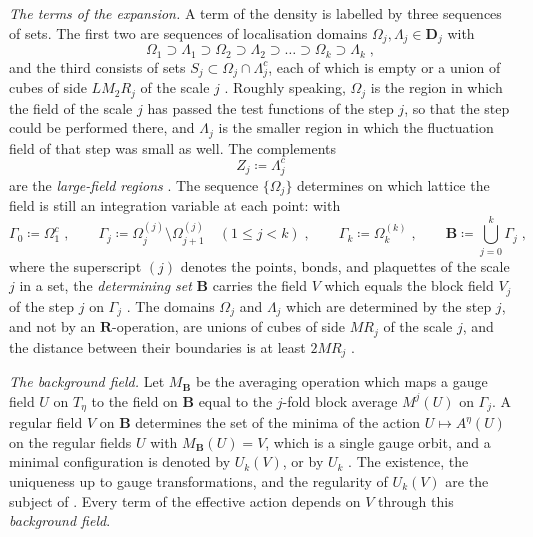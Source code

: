 \documentclass[11pt]{preprint}
\numberwithin{equation}{section}
\theoremstyle{definition}
\theoremstyle{remark}
\theoremstyle{plain}
\begin{document}
\emph{The terms of the expansion.} A term of the density is labelled by three sequences of sets. The first two are sequences of localisation domains $\Omega_j, \Lambda_j \in \mathbf D_j$ with
\begin{equation}\label{eq:domain-sequences}
    \Omega_1 \supset \Lambda_1 \supset \Omega_2 \supset \Lambda_2 \supset \dots \supset \Omega_k \supset \Lambda_k\;,
\end{equation}
and the third consists of sets $S_j \subset \Omega_j \cap \Lambda_j^c$, each of which is empty or a union of cubes of side $LM_2R_j$ of the scale $j$ \cite[(2.1), p.~254]{BalabanCRE}. Roughly speaking, $\Omega_j$ is the region in which the field of the scale $j$ has passed the test functions of the step $j$, so that the step could be performed there, and $\Lambda_j$ is the smaller region in which the fluctuation field of that step was small as well. The complements
\begin{equation}\label{eq:large-field-regions}
    Z_j \coloneqq \Lambda_j^c
\end{equation}
are the \emph{large-field regions} \cite[(2.3), p.~255]{BalabanCRE}. The sequence $\{ \Omega_j \}$ determines on which lattice the field is still an integration variable at each point: with
\begin{equation}\label{eq:determining-set}
    \Gamma_0 \coloneqq \Omega_1^c\;,
    \qquad
    \Gamma_j \coloneqq \Omega_j^{(j)} \setminus \Omega_{j+1}^{(j)} \quad (1 \leq j < k)\;,
    \qquad
    \Gamma_k \coloneqq \Omega_k^{(k)}\;,
    \qquad
    \mathbf B \coloneqq \bigcup_{j=0}^{k}\Gamma_j\;,
\end{equation}
where the superscript $(j)$ denotes the points, bonds, and plaquettes of the scale $j$ in a set, the \emph{determining set} $\mathbf B$ carries the field $V$ which equals the block field $V_j$ of the step $j$ on $\Gamma_j$ \cite[(2.2), (2.10), pp.~255--256]{BalabanCRE}. The domains $\Omega_j$ and $\Lambda_j$ which are determined by the step $j$, and not by an $\mathbf R$-operation, are unions of cubes of side $MR_j$ of the scale $j$, and the distance between their boundaries is at least $2MR_j$ \cite[p.~256]{BalabanCRE}.

\emph{The background field.} Let $M_{\mathbf B}$ be the averaging operation which maps a gauge field $U$ on $T_\eta$ to the field on $\mathbf B$ equal to the $j$-fold block average $M^j(U)$ on $\Gamma_j$. A regular field $V$ on $\mathbf B$ determines the set of the minima of the action $U \mapsto A^\eta(U)$ on the regular fields $U$ with $M_{\mathbf B}(U) = V$, which is a single gauge orbit, and a minimal configuration is denoted by $U_k(V)$, or by $U_k$ \cite[(2.11), (2.12), p.~256]{BalabanCRE}. The existence, the uniqueness up to gauge transformations, and the regularity of $U_k(V)$ are the subject of \cite{BalabanVAR}. Every term of the effective action depends on $V$ through this \emph{background field}.
\end{document}
